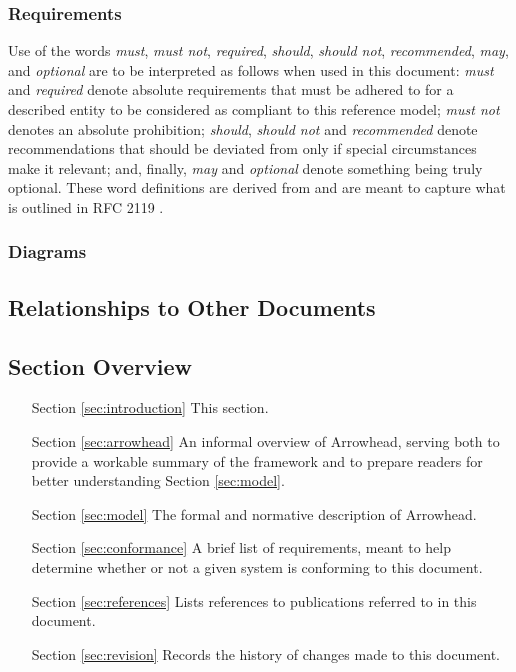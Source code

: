 \subsubsection{Requirements}

Use of the words \textit{must}, \textit{must not}, \textit{required}, \textit{should}, \textit{should not}, \textit{recommended}, \textit{may}, and \textit{optional} are to be interpreted as follows when used in this document: \textit{must} and \textit{required} denote absolute requirements that must be adhered to for a described entity to be considered as compliant to this reference model; \textit{must not} denotes an absolute prohibition; \textit{should}, \textit{should not} and \textit{recommended} denote recommendations that should be deviated from only if special circumstances make it relevant; and, finally, \textit{may} and \textit{optional} denote something being truly optional.
These word definitions are derived from and are meant to capture what is outlined in RFC 2119 \cite{bradner1997keywords}.

\subsubsection{Diagrams}

\subsection{Relationships to Other Documents}
\label{sec:introduction:relationships}

\subsection{Section Overview}
\label{sec:introduction:sections}

\begin{itemize}[leftmargin=3cm,rightmargin=0pt,labelwidth=2cm,labelsep=0pt,itemindent=0pt,parsep=0.25cm,topsep=0.25cm,align=left]

\item[Section \ref{sec:introduction}]
This section.

\item[Section \ref{sec:arrowhead}]
An informal overview of Arrowhead, serving both to provide a workable summary of the framework and to prepare readers for better understanding Section \ref{sec:model}.

\item[Section \ref{sec:model}]
The formal and normative description of Arrowhead.

\item[Section \ref{sec:conformance}]
A brief list of requirements, meant to help determine whether or not a given system is conforming to this document.

\item[Section \ref{sec:references}]
Lists references to publications referred to in this document.

\item[Section \ref{sec:revision}]
Records the history of changes made to this document.

\end{itemize}
